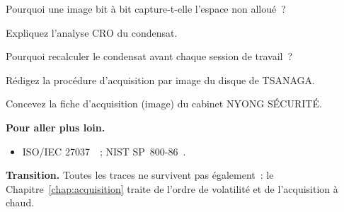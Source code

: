 \begin{boxexo}[title={\ding{45}\quad Exercice~8.6. L'espace non alloué \niveaumoyen}]
Pourquoi une image bit à bit capture-t-elle l'espace non alloué~?
\end{boxexo}

\begin{boxexo}[title={\ding{45}\quad Exercice~8.7. CRO \niveaumoyen}]
Expliquez l'analyse CRO du condensat.
\end{boxexo}

\begin{boxexo}[title={\ding{45}\quad Exercice~8.8. Re-hacher \niveaumoyen}]
Pourquoi recalculer le condensat avant chaque session de travail~?
\end{boxexo}

\begin{boxexo}[title={\ding{45}\quad Exercice~8.9. Procédure \niveauexpert}]
Rédigez la procédure d'acquisition par image du disque de TSANAGA.
\end{boxexo}

\begin{boxexo}[title={\ding{45}\quad Exercice~8.10. Fiche d'image \niveauexpert}]
Concevez la fiche d'acquisition (image) du cabinet NYONG SÉCURITÉ.
\end{boxexo}

\bigskip

\begin{boxinfo}
\textbf{Pour aller plus loin.}
\begin{itemize}
    \item ISO/IEC 27037~\cite{iso27037}~; NIST SP~800-86~\cite{nist80086}.
\end{itemize}
\end{boxinfo}

\begin{boxinfo}
\textbf{Transition.} Toutes les traces ne survivent pas également~: le
Chapitre~\ref{chap:acquisition} traite de l'ordre de volatilité et de
l'acquisition à chaud.
\end{boxinfo}

